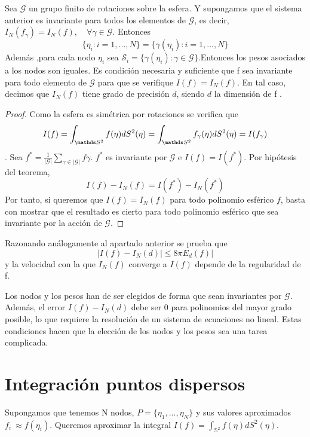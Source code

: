 \begin{thm}Sea $\mathcal{G}$ un grupo finito de rotaciones sobre la esfera. Y supongamos que el sistema anterior es invariante para todos los elementos de $\mathcal{G}$, es decir, $I_N(f_\gamma)=I_N(f), \quad \forall \gamma \in \mathcal{G}$. Entonces $$\{\eta_i:i=1,...,N\}=\{\gamma(\eta_i):i=1,...,N\}$$ Además ,para cada nodo $\eta_i$ sea $\mathcal{S}_i=\{\gamma(\eta_i):\gamma \in \mathcal{G}\}$.Entonces los pesos asociados a los nodos son iguales. Es condición necesaria y suficiente que f sea invariante para todo elemento de $\mathcal{G}$ para que  se verifique $I(f)=I_N(f)$. En tal caso, decimos que $I_N(f)$ tiene grado de precisión $d$, siendo $d$ la dimensión de f .

\end{thm}
\begin{proof}
Como la esfera es simétrica por rotaciones se verifica que $$I(f) = \int_{\esfera} f(\eta)dS^2(\eta) = \int_{\esfera} f_\gamma(\eta)dS^2(\eta) = I(f_\gamma)$$.
Sea $f^* = \frac{1}{|\mathcal{G}|} \sum_{\gamma \in |\mathcal{G}| } f\gamma$. $f^*$ es invariante por $\mathcal{G}$ e $I(f) = I(f^*)$. Por hipótesis del teorema, 
$$I(f)-I_N(f) = I(f^*) - I_N(f^*) $$
Por tanto, si queremos que $I(f)=I_N(f)$ para todo polinomio esférico $f$, basta con mostrar que el resultado es cierto para todo polinomio esférico que sea invariante por la acción de  $\mathcal{G}$.
\end{proof}
Razonando análogamente al apartado anterior se prueba que
$$
|I(f)-I_N(d)| \le 8\pi E_d(f)|
$$
y la velocidad con la que $I_N(f)$ converge a $I(f)$ depende de la regularidad de f.
\medskip

Los nodos y los pesos han de ser elegidos de forma que sean invariantes por $\mathcal{G}$. Además, el error $I(f)-I_N(d)$ debe ser 0 para polinomios del mayor grado posible, lo que requiere la resolución de un sistema de ecuaciones no lineal. Estas condiciones hacen que la elección de los nodos y los pesos sea una tarea complicada.

\section{Integración puntos dispersos}
Supongamos que tenemos N nodos, $P=\{\eta_1,...,\eta_N\}$ y sus valores aproximados $f_i~\approx f(\eta_i)$. Queremos aproximar la integral $I(f) =  \int_{\mathds{S}^2} f(\eta)dS^2(\eta)$.

